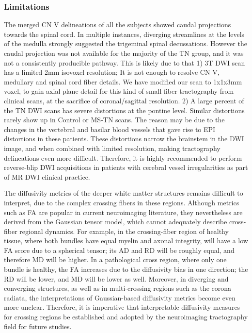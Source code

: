 \subsubsection{Limitations}
The merged CN V delineations of all the subjects showed caudal projections towards the spinal cord. In multiple instances, diverging streamlines at the levels of the medulla strongly suggested the trigeminal spinal decussations. However the caudal projection was not available for the majority of the TN group, and it was not a consistently producible pathway. This is likely due to that 1) 3T DWI scan has a limited 2mm isovoxel resolution; It is not enough to resolve CN V, medullary and spinal cord fiber details. We have modified our scan to 1x1x3mm voxel, to gain axial plane detail for this kind of small fiber tractography from clinical scans, at the sacrifice of coronal/sagittal resolution. 2) A large percent of the TN DWI scans has severe distortions at the pontine level. Similar distortions rarely show up in Control or MS-TN scans. The reason may be due to the changes in the vertebral and basilar blood vessels that gave rise to EPI distortions in these patients. These distortions narrow the brainstem in the DWI image, and when combined with limited resolution, making tractography delineations even more difficult. Therefore, it is highly recommended to perform reverse-blip DWI acquisitions in patients with cerebral vessel irregularities as part of MR DWI clinical practice. 

The diffusivity metrics of the deeper white matter structures remains difficult to interpret, due to the complex crossing fibers in these regions. Although metrics such as FA are popular in current neuroimaging literature, they nevertheless are derived from the Gaussian tensor model, which cannot adequately describe cross-fiber regional dynamics. For example, in the crossing-fiber region of healthy tissue, where both bundles have equal myelin and axonal integrity, will have a low FA score due to a spherical tensor; its AD and RD will be roughly equal, and therefore MD will be higher. In a pathological cross region, where only one bundle is healthy, the FA increases due to the diffusivity bias in one direction; the RD will be lower, and MD will be lower as well. Moreover, in diverging and converging structures, as well as in multi-crossing regions such as the corona radiata, the interpretations of Gaussian-based diffusivity metrics become even more unclear. Therefore, it is imperative that interpretable diffusivity measures for crossing regions be established and adopted by the neuroimaging tractography field for future studies. 

